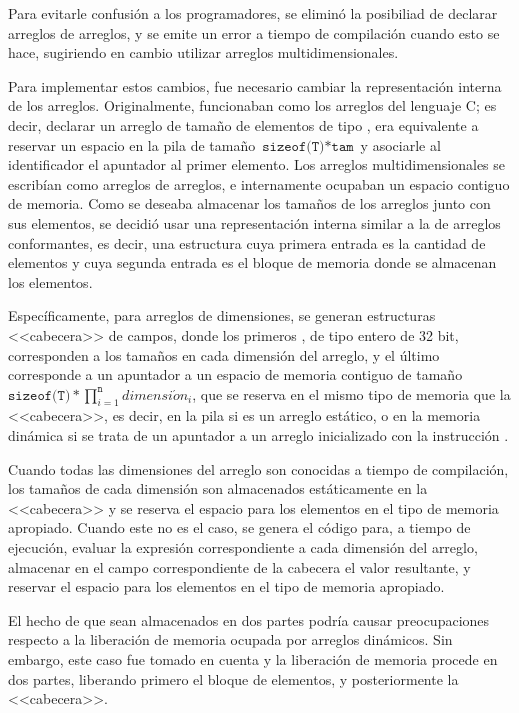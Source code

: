 Para evitarle confusión a los programadores, se eliminó la posibiliad de
declarar arreglos de arreglos, y se emite un error a tiempo de compilación
cuando esto se hace, sugiriendo en cambio utilizar arreglos multidimensionales.

Para implementar estos cambios, fue necesario cambiar la representación interna
de los arreglos. Originalmente, funcionaban como los arreglos del lenguaje C; es
decir, declarar un arreglo  de tamaño  de elementos de
tipo , era equivalente a reservar un espacio en la pila de tamaño
$\texttt{sizeof(T)} * \texttt{tam}$ y asociarle al identificador  el
apuntador al primer elemento. Los arreglos multidimensionales se escribían como
arreglos de arreglos, e internamente ocupaban un espacio contiguo de memoria.
Como se deseaba almacenar los tamaños de los arreglos junto con sus elementos,
se decidió usar una representación interna similar a la de arreglos
conformantes, es decir, una estructura cuya primera entrada es la cantidad de
elementos y cuya segunda entrada es el bloque de memoria donde se almacenan los
elementos.

Específicamente, para arreglos de  dimensiones, se generan estructuras
<<cabecera>> de  campos, donde los primeros , de tipo
entero de 32 bit, corresponden a los tamaños en cada dimensión del arreglo, y el
último corresponde a un apuntador a un espacio de memoria contiguo de tamaño
$\texttt{sizeof(T)} * \prod\limits_{i=1}^\texttt{n} dimensi\acute{o}n_i$, que se
reserva en el mismo tipo de memoria que la <<cabecera>>, es decir, en la pila si
es un arreglo estático, o en la memoria dinámica si se trata de un apuntador a
un arreglo inicializado con la instrucción .

Cuando todas las dimensiones del arreglo son conocidas a tiempo de compilación,
los tamaños de cada dimensión son almacenados estáticamente en la <<cabecera>> y
se reserva el espacio para los elementos en el tipo de memoria apropiado. Cuando
este no es el caso, se genera el código para, a tiempo de ejecución, evaluar la
expresión correspondiente a cada dimensión del arreglo, almacenar en el campo
correspondiente de la cabecera el valor resultante, y reservar el espacio para
los elementos en el tipo de memoria apropiado.

El hecho de que sean almacenados en dos partes podría causar preocupaciones
respecto a la liberación de memoria ocupada por arreglos dinámicos. Sin embargo,
este caso fue tomado en cuenta y la liberación de memoria procede en dos partes,
liberando primero el bloque de elementos, y posteriormente la <<cabecera>>.

